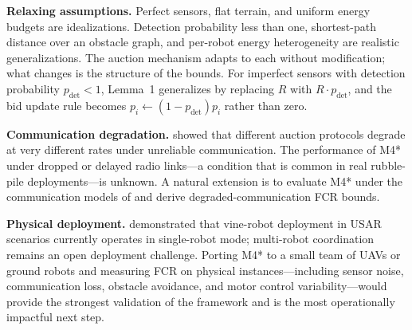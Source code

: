 \begin{doublespacing}
\textbf{Relaxing assumptions.} Perfect sensors, flat terrain, and
uniform energy budgets are idealizations. Detection probability less
than one, shortest-path distance over an obstacle graph, and per-robot
energy heterogeneity are realistic generalizations. The auction
mechanism adapts to each without modification; what changes is the
structure of the bounds. For imperfect sensors with detection
probability $p_{\mathrm{det}} < 1$, Lemma~1 generalizes by replacing
$R$ with $R \cdot p_{\mathrm{det}}$, and the bid update rule becomes
$p_i \leftarrow (1 - p_{\mathrm{det}}) p_i$ rather than zero.

\textbf{Communication degradation.} \citet{OtteKuhlman2020} showed
that different auction protocols degrade at very different rates under
unreliable communication. The performance of M4* under dropped or
delayed radio links---a condition that is common in real rubble-pile
deployments---is unknown. A natural extension is to evaluate M4* under
the communication models of \citeauthor{OtteKuhlman2020} and derive
degraded-communication FCR bounds.

\textbf{Physical deployment.} \citet{Coad2024SPROUT} demonstrated
that vine-robot deployment in USAR scenarios currently operates in
single-robot mode; multi-robot coordination remains an open
deployment challenge. Porting M4* to a small team of UAVs or ground
robots and measuring FCR on physical instances---including sensor
noise, communication loss, obstacle avoidance, and motor control
variability---would provide the strongest validation of the framework
and is the most operationally impactful next step.

\end{doublespacing}
